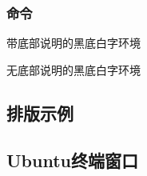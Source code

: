 \documentclass{ctexart}
\begin{document}
\subsubsection{命令}
\begin{langPyOne}[tex]{带底部说明的黑底白字环境}
\end{langPyOne}
\begin{langPyOne}[tex]{无底部说明的黑底白字环境}
\end{langPyOne}

\subsection{排版示例}
\subsection{Ubuntu终端窗口}

\end{document}

